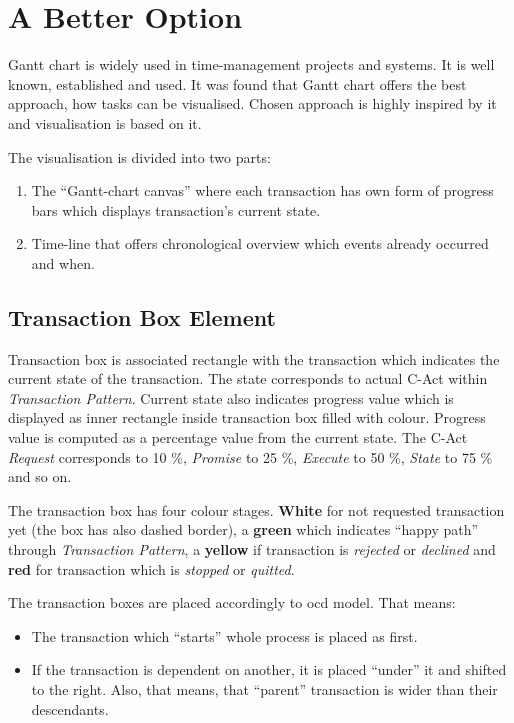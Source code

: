 \section{A Better Option}
Gantt chart is widely used in time-management projects and systems. It is well known, established and used. It was found that Gantt chart offers the best approach, how tasks can be visualised. Chosen approach is highly inspired by it and visualisation is based on it. 

The visualisation is divided into two parts:
\begin{enumerate}
\item The ``Gantt-chart canvas'' where each transaction has own form of progress bars which displays transaction's current state.
\item Time-line that offers chronological overview which events already occurred and when. 
\end{enumerate}
\subsection{Transaction Box Element}
Transaction box is associated rectangle with the transaction which indicates the current state of the transaction. The state corresponds to actual C-Act within \textit{Transaction Pattern}. Current state also indicates progress value which is displayed as inner rectangle inside transaction box filled with colour. Progress value is computed as a percentage value from the current state. The C-Act \textit{Request} corresponds to 10 \%, \textit{Promise} to 25 \%, \textit{Execute} to 50 \%, \textit{State} to 75 \% and so on.  

The transaction box has four colour stages. \textbf{White} for not requested transaction yet (the box has also dashed border), a \textbf{green} which indicates ``happy path'' through \textit{Transaction Pattern}, a \textbf{yellow} if transaction is \textit{rejected} or \textit{declined} and \textbf{red} for transaction which is \textit{stopped} or \textit{quitted}. 

The transaction boxes are placed accordingly to \gls{ocd} model. That means:
\begin{itemize}
\item The transaction which ``starts'' whole process is placed as first. 
\item If the transaction is dependent on another, it is placed ``under'' it and shifted to the right. Also, that means, that ``parent'' transaction is wider than their descendants. 
\end{itemize}
